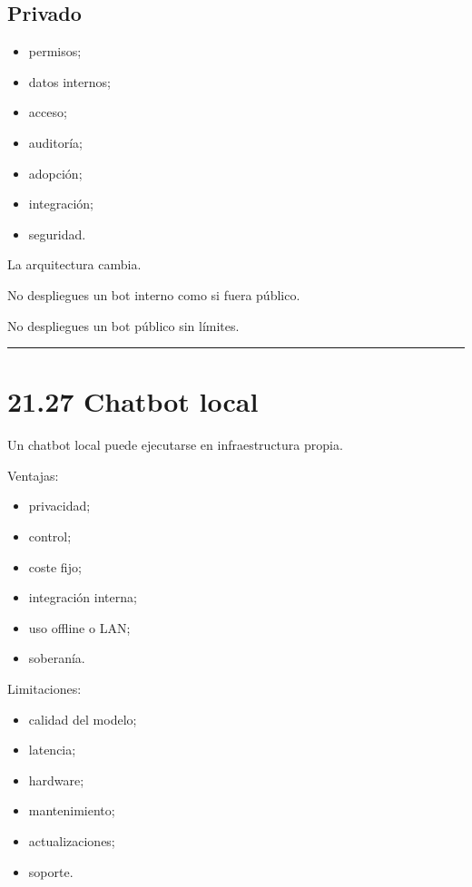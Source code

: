\subsection{Privado}\label{privado}

\begin{itemize}
\tightlist
\item
  permisos;
\item
  datos internos;
\item
  acceso;
\item
  auditoría;
\item
  adopción;
\item
  integración;
\item
  seguridad.
\end{itemize}

La arquitectura cambia.

No despliegues un bot interno como si fuera público.

No despliegues un bot público sin límites.

\begin{center}\rule{0.5\linewidth}{0.5pt}\end{center}

\section{21.27 Chatbot local}\label{chatbot-local}

Un chatbot local puede ejecutarse en infraestructura propia.

Ventajas:

\begin{itemize}
\tightlist
\item
  privacidad;
\item
  control;
\item
  coste fijo;
\item
  integración interna;
\item
  uso offline o LAN;
\item
  soberanía.
\end{itemize}

Limitaciones:

\begin{itemize}
\tightlist
\item
  calidad del modelo;
\item
  latencia;
\item
  hardware;
\item
  mantenimiento;
\item
  actualizaciones;
\item
  soporte.
\end{itemize}

